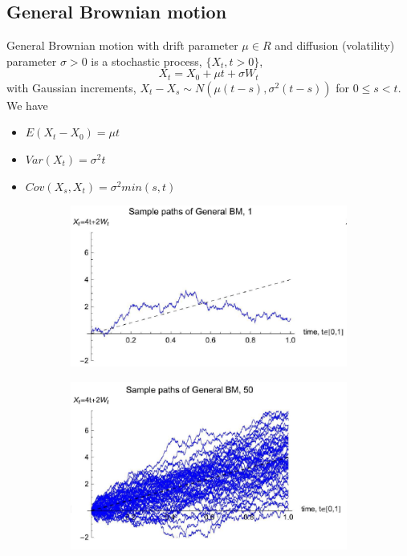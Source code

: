 \documentclass[11pt,a4paper]{book}
\theoremstyle{definition}\newtheorem{definition}{Definition}
\theoremstyle{definition}\newtheorem{fact}{Fact}
\theoremstyle{definition}\newtheorem{remark}{Remark}
\theoremstyle{definition}\newtheorem{ex}{Ex.}
\theoremstyle{definition}\newtheorem{project}{Project}
\theoremstyle{definition}\newtheorem{problem}{Problem}
\theoremstyle{definition}\newtheorem{example}{Example}
\numberwithin{theorem}{section}
\numberwithin{corollary}{chapter}
\numberwithin{assumption}{chapter}
\numberwithin{definition}{chapter}
\numberwithin{prop}{chapter}
\numberwithin{notation}{chapter}
\numberwithin{problem}{chapter}
\numberwithin{example}{chapter}
\numberwithin{fact}{chapter}
\numberwithin{ex}{chapter}
\begin{document}
\subsection{General Brownian motion}
General Brownian motion with drift parameter $\mu \in R$ and diffusion (volatility) parameter $\sigma > 0$ is a stochastic process, $\{X_t,t>0\}$,
$$ X_t = X_0 + \mu t + \sigma W_t $$
with Gaussian increments, $X_t - X_s \sim N(\mu(t-s), \sigma^2(t-s))$ for $0 \leq s < t$. We have
\begin{itemize}
\item $E(X_t - X_0) = \mu t$
\item $Var(X_t) = \sigma^2 t$
\item $Cov(X_s, X_t) = \sigma^2 min(s,t)$
\end{itemize}

\begin{figure}[H]
	\begin{subfigure}{0.5\textwidth}
		\centering
		\includegraphics[scale=0.5]{Chapter01/Chapter1_4.png}
	\end{subfigure}
	\begin{subfigure}{0.5\textwidth}
		\centering
		\includegraphics[scale=0.5]{Chapter01/Chapter1_5.png}
	\end{subfigure}
\end{figure}
\end{document}
